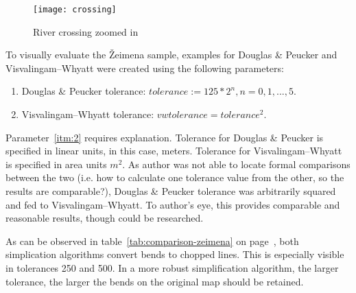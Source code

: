 \documentclass[a4paper]{article}
\newcommand{\DP}{Douglas \& Peucker}
\newcommand{\VW}{Visvalingam--Whyatt}
\begin{document}
\begin{figure}[h]
    \centering
    \texttt{[image: crossing]}
    \caption{River crossing zoomed in}
    \label{fig:crossing}
\end{figure}


To visually evaluate the Žeimena sample, examples for {\DP} and {\VW}
were created using the following parameters:

\begin{enumerate}[label=(\Roman*)]
    \item {\DP} tolerance: $tolerance := 125 * 2^n, n = 0,1,...,5$.
    \item {\VW} tolerance: $vwtolerance = tolerance ^ 2$\label{itm:2}.
\end{enumerate}

Parameter~\ref{itm:2} requires explanation. Tolerance for {\DP} is specified in
linear units, in this case, meters. Tolerance for {\VW} is specified in area
units $m^2$. As author was not able to locate formal comparisons between the
two (i.e. how to calculate one tolerance value from the other, so the results
are comparable?), {\DP} tolerance was arbitrarily squared and fed to {\VW}. To
author's eye, this provides comparable and reasonable results, though could be
researched.

As can be observed in table~\ref{tab:comparison-zeimena} on
page~\pageref{tab:comparison-zeimena}, both simplication algorithms convert
bends to chopped lines. This is especially visible in tolerances 250 and 500.
In a more robust simplification algorithm, the larger tolerance, the larger the
bends on the original map should be retained.
\end{document}
